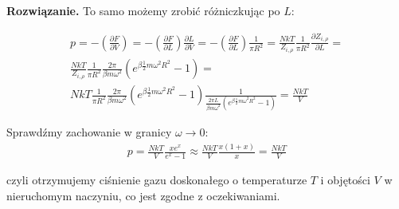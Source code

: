 \documentclass[11pt,a4paper]{article}
\newenvironment{solution}{\vspace{1cm} \par\textbf{Rozwiązanie.} \vspace{1cm}}{}
\begin{document}
\begin{solution}
To samo możemy zrobić różniczkując po $L$:

\begin{align*}
  p = -\left( \frac{\partial F}{\partial V} \right) =
  -\left( \frac{\partial F}{\partial L} \right) \frac{\partial L}{\partial V} = 
  -\left(\frac{\partial F}{\partial L} \right) \frac{1}{\pi R^2} =
  \frac{NkT}{Z_{i,\rho}} \frac{1}{\pi R^2} \frac{\partial Z_{i,\rho}}{\partial L} = \\
  \frac{NkT}{Z_{i,\rho}} \frac{1}{\pi R^2} \frac{2\pi}{\beta m \omega^2} \left(e^{\beta \frac{1}{2} m \omega^2 R^2}-1\right) = \\
   NkT\frac{1}{\pi R^2} \frac{2\pi}{\beta m \omega^2} \left(e^{\beta \frac{1}{2} m \omega^2 R^2}-1\right) 
  \frac{1}{\frac{2\pi L}{\beta m \omega^2} \left(e^{\beta \frac{1}{2} m \omega^2 R^2}-1\right)} =
  \frac{NkT}{V} 
\end{align*}


Sprawdźmy zachowanie w granicy $\omega \to 0$:
\begin{align*}
  p = \frac{NkT}{V} \frac{x e^{x}}{e^{x}-1} \approx \frac{NkT}{V} \frac{x(1+x)}{x} = \frac{NkT}{V}
\end{align*}

czyli otrzymujemy ciśnienie gazu doskonałego o temperaturze $T$ i objętości $V$ 
w nieruchomym naczyniu, co jest zgodne z oczekiwaniami.



\newpage   
\end{solution}
\end{document}
